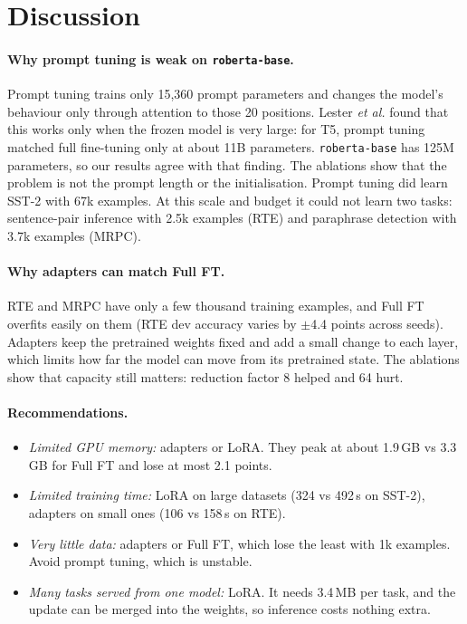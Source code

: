 \documentclass{nle}
\begin{document}
\section{Discussion}

\paragraph{Why prompt tuning is weak on \texttt{roberta-base}.} Prompt tuning trains only 15,360 prompt parameters and changes the model's behaviour only through attention to those 20 positions. Lester {\it et al.}  found that this works only when the frozen model is very large: for T5, prompt tuning matched full fine-tuning only at about 11B parameters. \texttt{roberta-base} has 125M parameters, so our results agree with that finding. The ablations show that the problem is not the prompt length or the initialisation. Prompt tuning did learn SST-2 with 67k examples. At this scale and budget it could not learn two tasks: sentence-pair inference with 2.5k examples (RTE) and paraphrase detection with 3.7k examples (MRPC).

\paragraph{Why adapters can match Full FT.} RTE and MRPC have only a few thousand training examples, and Full FT overfits easily on them (RTE dev accuracy varies by $\pm$4.4 points across seeds). Adapters keep the pretrained weights fixed and add a small change to each layer, which limits how far the model can move from its pretrained state. The ablations show that capacity still matters: reduction factor 8 helped and 64 hurt.

\paragraph{Recommendations.}
\begin{itemize}
  \item {\it Limited GPU memory:} adapters or LoRA. They peak at about 1.9\,GB vs 3.3\,GB for Full FT and lose at most 2.1 points.
  \item {\it Limited training time:} LoRA on large datasets (324 vs 492\,s on SST-2), adapters on small ones (106 vs 158\,s on RTE).
  \item {\it Very little data:} adapters or Full FT, which lose the least with 1k examples. Avoid prompt tuning, which is unstable.
  \item {\it Many tasks served from one model:} LoRA. It needs 3.4\,MB per task, and the update can be merged into the weights, so inference costs nothing extra.
\end{itemize}
\end{document}
